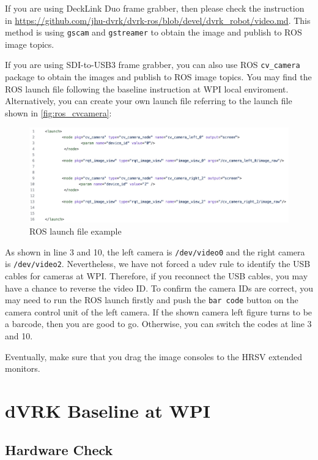 If you are using DeckLink Duo frame grabber, then please check the instruction in \url{https://github.com/jhu-dvrk/dvrk-ros/blob/devel/dvrk_robot/video.md}. This method is using \texttt{gscam} and \texttt{gstreamer} to obtain the image and publish to ROS image topics.

If you are using SDI-to-USB3 frame grabber, you can also use ROS \texttt{cv\_camera} package to obtain the images and publish to ROS image topics. You may find the ROS launch file following the baseline instruction at WPI local enviroment. Alternatively, you can create your own launch file referring to the launch file shown in \autoref{fig:ros_cvcamera}:

\begin{figure}[H]
    \centering
    \includegraphics[width=0.95\linewidth]{figures/roslaunch_cvcamera.jpg}
    \caption{ROS launch file example}
    \label{fig:ros_cvcamera}
\end{figure}

As shown in line 3 and 10, the left camera is \texttt{\slash dev\slash video0} and the right camera is \texttt{\slash dev\slash video2}. Nevertheless, we have not forced a udev rule to identify the USB cables for cameras at WPI. Therefore, if you reconnect the USB cables, you may have a chance to reverse the video ID. To confirm the camera IDs are correct, you may need to run the ROS launch firstly and push the \texttt{bar code} button on the camera control unit of the left camera. If the shown camera left figure turns to be a barcode, then you are good to go. Otherwise, you can switch the codes at line 3 and 10.

Eventually, make sure that you drag the image consoles to the HRSV extended monitors.

\chapter{dVRK Baseline at WPI}
\label{ch: baseline}

\section{Hardware Check}


